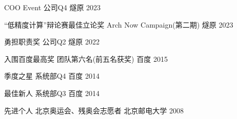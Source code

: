 
\begin{cvhonors}

  \cvhonor
    {COO Event} %
    {公司Q4} %
    {燧原} %
    {2023} %

  \cvhonor
    {“低精度计算”辩论赛最佳立论奖} %
    {Arch Now Campaign(第二期)} %
    {燧原} %
    {2023} %

  \cvhonor
    {勇担职责奖} %
    {公司Q2} %
    {燧原} %
    {2022} %

  \cvhonor
    {入围百度最高奖} %
    {团队第六名(前五名获奖)} %
    {百度} %
    {2015} %

  \cvhonor
    {季度之星} %
    {系统部Q4} %
    {百度} %
    {2014} %

  \cvhonor
    {最佳新人} %
    {系统部Q3} %
    {百度} %
    {2014} %

  \cvhonor
    {先进个人} %
    {北京奥运会、残奥会志愿者} %
    {北京邮电大学} %
    {2008} %

\end{cvhonors}
